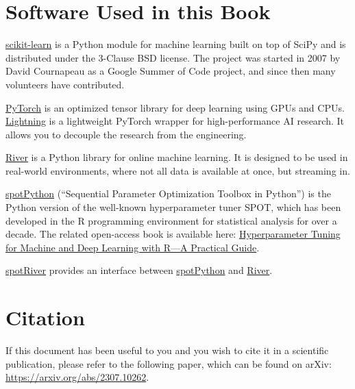 \documentclass[
  letterpaper,
  DIV=11,
  numbers=noendperiod]{scrreprt}
\begin{document}
\section*{Software Used in this Book}\label{software-used-in-this-book}


\href{https://scikit-learn.org}{scikit-learn} is a Python module for
machine learning built on top of SciPy and is distributed under the
3-Clause BSD license. The project was started in 2007 by David
Cournapeau as a Google Summer of Code project, and since then many
volunteers have contributed.

\href{https://pytorch.org}{PyTorch} is an optimized tensor library for
deep learning using GPUs and CPUs.
\href{https://lightning.ai/docs/pytorch/latest/}{Lightning} is a
lightweight PyTorch wrapper for high-performance AI research. It allows
you to decouple the research from the engineering.

\href{https://riverml.xyz}{River} is a Python library for online machine
learning. It is designed to be used in real-world environments, where
not all data is available at once, but streaming in.

\href{https://github.com/sequential-parameter-optimization/spotPython}{spotPython}
(``Sequential Parameter Optimization Toolbox in Python'') is the Python
version of the well-known hyperparameter tuner SPOT, which has been
developed in the R programming environment for statistical analysis for
over a decade. The related open-access book is available here:
\href{https://link.springer.com/book/10.1007/978-981-19-5170-1}{Hyperparameter
Tuning for Machine and Deep Learning with R---A Practical Guide}.

\href{https://github.com/sequential-parameter-optimization/spotRiver}{spotRiver}
provides an interface between
\href{https://github.com/sequential-parameter-optimization/spotPython}{spotPython}
and \href{https://riverml.xyz}{River}.

\section*{Citation}\label{citation}


If this document has been useful to you and you wish to cite it in a
scientific publication, please refer to the following paper, which can
be found on arXiv: \url{https://arxiv.org/abs/2307.10262}.
\end{document}
